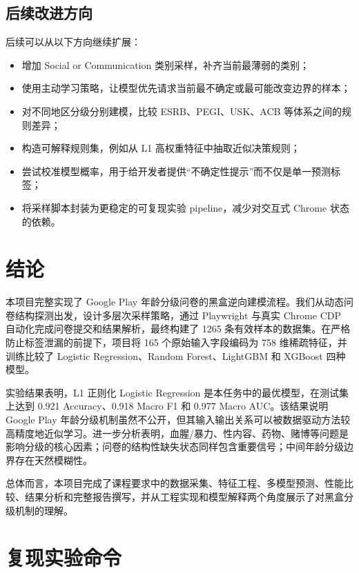 \documentclass[UTF8]{ctexart}
\begin{document}
\subsection{后续改进方向}

后续可以从以下方向继续扩展：

\begin{itemize}[leftmargin=2em]
  \item 增加 Social or Communication 类别采样，补齐当前最薄弱的类别；
  \item 使用主动学习策略，让模型优先请求当前最不确定或最可能改变边界的样本；
  \item 对不同地区分级分别建模，比较 ESRB、PEGI、USK、ACB 等体系之间的规则差异；
  \item 构造可解释规则集，例如从 L1 高权重特征中抽取近似决策规则；
  \item 尝试校准模型概率，用于给开发者提供“不确定性提示”而不仅是单一预测标签；
  \item 将采样脚本封装为更稳定的可复现实验 pipeline，减少对交互式 Chrome 状态的依赖。
\end{itemize}

\section{结论}

本项目完整实现了 Google Play 年龄分级问卷的黑盒逆向建模流程。我们从动态问卷结构探测出发，设计多层次采样策略，通过 Playwright 与真实 Chrome CDP 自动化完成问卷提交和结果解析，最终构建了 1265 条有效样本的数据集。在严格防止标签泄漏的前提下，项目将 165 个原始输入字段编码为 758 维稀疏特征，并训练比较了 Logistic Regression、Random Forest、LightGBM 和 XGBoost 四种模型。

实验结果表明，L1 正则化 Logistic Regression 是本任务中的最优模型，在测试集上达到 0.921 Accuracy、0.918 Macro F1 和 0.977 Macro AUC。该结果说明 Google Play 年龄分级机制虽然不公开，但其输入输出关系可以被数据驱动方法较高精度地近似学习。进一步分析表明，血腥/暴力、性内容、药物、赌博等问题是影响分级的核心因素；问卷的结构性缺失状态同样包含重要信号；中间年龄分级边界存在天然模糊性。

总体而言，本项目完成了课程要求中的数据采集、特征工程、多模型预测、性能比较、结果分析和完整报告撰写，并从工程实现和模型解释两个角度展示了对黑盒分级机制的理解。

\appendix
\section{复现实验命令}
\end{document}
